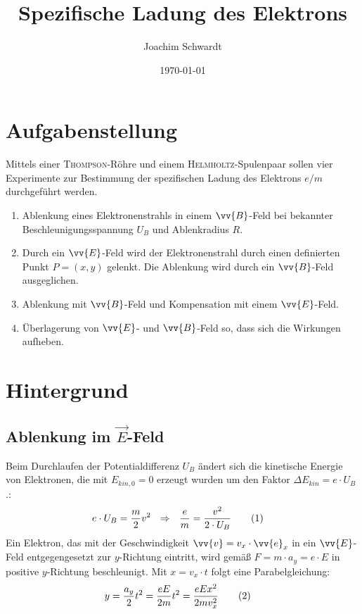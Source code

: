 \documentclass[a4paper,12pt]{article}
\newcommand\numberthis{\addtocounter{equation}{1}\tag{\theequation}}
\begin{document}
\title{Spezifische Ladung des Elektrons}
\author{Joachim Schwardt}
\date{\today}
\maketitle

\section{Aufgabenstellung}
Mittels einer \textsc{Thompson}-Röhre und einem \textsc{Helmholtz}-Spulenpaar sollen vier Experimente zur Bestimmung der spezifischen Ladung des Elektrons $e/m$durchgeführt werden.
\begin{enumerate}
\item Ablenkung eines Elektronenstrahls in einem $\vv{B}$-Feld bei bekannter Beschleunigungsspannung $U_B$ und Ablenkradius $R$.
\item Durch ein $\vv{E}$-Feld wird der Elektronenstrahl durch einen definierten Punkt $P=(x,y)$ gelenkt. Die Ablenkung wird durch ein $\vv{B}$-Feld ausgeglichen.
\item Ablenkung mit $\vv{B}$-Feld und Kompensation mit einem $\vv{E}$-Feld.
\item Überlagerung von $\vv{E}$- und $\vv{B}$-Feld so, dass sich die Wirkungen aufheben.
\end{enumerate}
\section{Hintergrund}
\subsection{Ablenkung im $\vec{E}$-Feld}
Beim Durchlaufen der Potentialdifferenz $U_B$ ändert sich die kinetische Energie von Elektronen, die mit $E_{kin,0}=0$ erzeugt wurden um den Faktor $\Delta E_{kin}=e\cdot U_B$.:
\begin{align*}
e\cdot U_B&=\frac{m}{2}v^2\ \ \Rightarrow\ \ \frac{e}{m}=\frac{v^2}{2\cdot U_B}\numberthis\label{e/m von v^2}
\end{align*}
Ein Elektron, das mit der Geschwindigkeit $\vv{v}=v_x\cdot\vv{e}_x$ in ein $\vv{E}$-Feld entgegengesetzt zur $y$-Richtung eintritt, wird gemäß $F=m\cdot a_y=e\cdot E$ in positive $y$-Richtung beschleunigt. Mit $x=v_x\cdot t$ folgt eine Parabelgleichung:
\begin{align*}
y&=\frac{a_y}{2}t^2=\frac{eE}{2m}t^2=\frac{eEx^2}{2mv_x^2} \numberthis\label{Parabelgleichung von E und v_x}
\end{align*}
\end{document}
